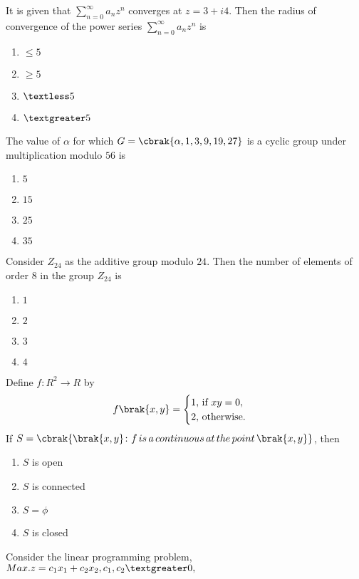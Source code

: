     \item It is given that $\sum_{n=0}^{\infty} a_nz^n$ converges at $z=3+i4$. Then the radius of convergence of the power series $\sum_{n=0}^{\infty} a_nz^n$ is
    \begin{enumerate}
        \item $\leq 5$
        \item $\geq 5$
        \item $\textless 5$
        \item $\textgreater 5$
    \end{enumerate}
    \item The value of $\alpha$ for which $G=\cbrak{\alpha,1,3,9,19,27}$ is a cyclic group under multiplication modulo $56$ is 
    \begin{enumerate}
        \item $5$
        \item $15$
        \item $25$
        \item $35$
    \end{enumerate}
    \item Consider $Z_24$ as the additive group modulo $24$. Then the number of elements of order $8$ in the group $Z_24$ is
    \begin{enumerate}
        \item $1$
        \item $2$
        \item $3$
        \item $4$
    \end{enumerate}
    \item Define $f\colon R^2\to R$ by 
    $$f\brak{x,y}=
    \begin{cases}
        1 \text{, if } xy=0,\\
        2 \text{, otherwise.}
    \end{cases}
    $$
    If $S=\cbrak{\brak{x,y}\colon f\, is\, a\, continuous\, at\, the\, point\, \brak{x,y}}$, then 
    \begin{enumerate}
        \item $S$ is open
        \item $S$ is connected
        \item $S=\phi$
        \item $S$ is closed
    \end{enumerate}
    \item Consider the linear programming problem,\\
    $Max.z=c_1x_1+c_2x_2,c_1,c_2\textgreater0,$\\
